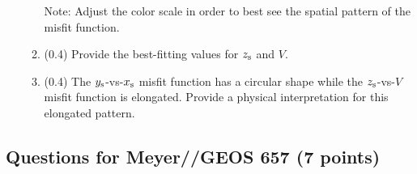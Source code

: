 \documentclass[11pt,titlepage,fleqn]{article}
\begin{document}
\begin{enumerate}
\begin{enumerate}
Note: Adjust the color scale in order to best see the spatial pattern of the misfit function.


\item (0.4) Provide the best-fitting values for $z_{\rm s}$ and $V$. 

\item (0.4) The $y_{\rm s}$-vs-$x_{\rm s}$ misfit function has a circular shape while the $z_{\rm s}$-vs-$V$ misfit function is elongated.
Provide a physical interpretation for this elongated pattern.
\end{enumerate}

\end{enumerate}


\subsection*{Questions for Meyer//GEOS 657 (7 points)}
\end{document}
